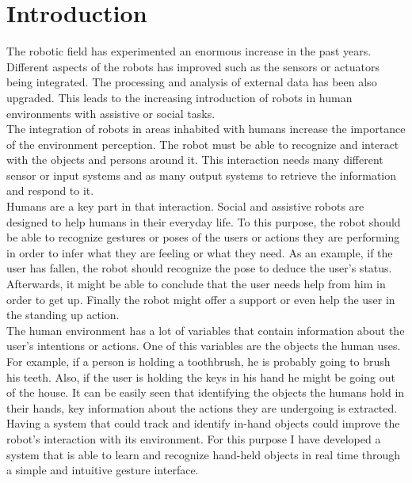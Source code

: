 \chapter{Introduction}
The robotic field has experimented an enormous increase in the past years. 
Different aspects of the robots has improved such as the sensors or actuators being integrated. 
The processing and analysis of external data has been also upgraded. 
This leads to the increasing introduction of robots in human environments with assistive or social tasks. 
\\

The integration of robots in areas inhabited with humans increase the importance of the environment perception. 
The robot must be able to recognize and interact with the objects and persons around it. 
This interaction needs many different sensor or input systems and as many output systems to retrieve the information and respond to it.  
\\

Humans are a key part in that interaction. 
Social and assistive robots are designed to help humans in their everyday life. 
To this purpose, the robot should be able to recognize gestures or poses of the users or actions they are performing in order to infer what they are feeling or what they need. 
As an example, if the user has fallen, the robot should recognize the pose to deduce the user's status. 
Afterwards, it might be able to conclude that the user needs help from him in order to get up. 
Finally the robot might offer a support or even help the user in the standing up action. 
\\

The human environment has a lot of variables that contain information about the user's intentions or actions. 
One of this variables are the objects the human uses. 
For example, if a person is holding a toothbrush, he is probably going to brush his teeth. 
Also, if the user is holding the keys in his hand he might be going out of the house. 
It can be easily seen that identifying the objects the humans hold in their hands, key information about the actions they are undergoing is extracted. 
\\

Having a system that could track and identify in-hand objects could improve the robot's interaction with its environment.
For this purpose I have developed a system that is able to learn and recognize hand-held objects in real time through a simple and intuitive gesture interface. 



